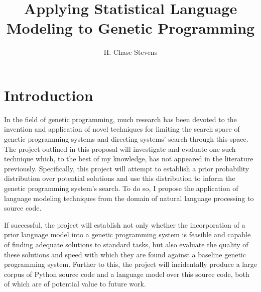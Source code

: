 \documentclass[a4paper,11pt]{proposal}
\title{Applying Statistical Language Modeling to Genetic Programming}
\author{H. Chase Stevens}
\begin{document}
\maketitle 
\parindent=0mm


\setcounter{tocdepth}{2}

\clearpage

\newpage


\setlength{\parskip}{1ex} 


\section{Introduction} \label{sec:intro}

In the field of genetic programming, much research has been devoted to the invention and application of novel techniques for limiting the search space of genetic programming systems and directing systems' search through this space. The project outlined in this proposal will investigate and evaluate one such technique which, to the best of my knowledge, has not appeared in the literature previously. Specifically, this project will attempt to establish a prior probability distribution over potential solutions and use this distribution to inform the genetic programming system's search. To do so, I propose the application of language modeling techniques from the domain of natural language processing to source code. 

If successful, the project will establish not only whether the incorporation of a prior language model into a genetic programming system is feasible and capable of finding adequate solutions to standard tasks, but also evaluate the quality of these solutions and speed with which they are found against a baseline genetic programming system. Further to this, the project will incidentally produce a large corpus of Python source code and a language model over this source code, both of which are of potential value to future work. 
\end{document}
